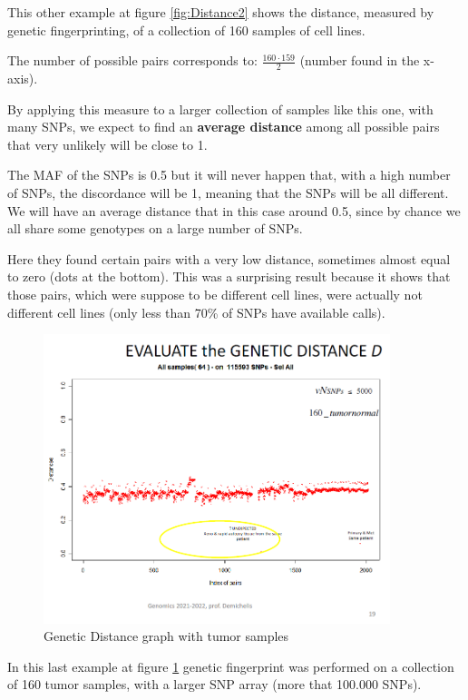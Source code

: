 \bigskip
This other example at figure \ref{fig:Distance2} shows the distance, measured by
genetic fingerprinting, of a collection of 160 samples of cell lines. 

The number of possible pairs corresponds to: $\frac{160 \cdot 159}{2}$ (number
found in the x-axis). 

By applying this measure to a larger collection of samples like this one, with
many SNPs, we expect to find an \textbf{average distance} among all possible
pairs that very unlikely will be close to 1. 

The MAF of the SNPs is 0.5 but it will never happen that, with a high number of
SNPs, the discordance will be 1, meaning that the SNPs will be all different. We
will have an average distance that in this case around 0.5, since by chance we
all share some genotypes on a large number of SNPs. 

Here they found certain pairs with a very low distance, sometimes almost equal
to zero (dots at the bottom). This was a surprising result because it shows that
those pairs, which were suppose to be different cell lines, were actually not
different cell lines (only less than 70\% of SNPs have available calls). 


\begin{figure}[ht]
	\centering
	\includegraphics[width=0.9\textwidth]{Distance3.PNG}
	\caption{\label{fig:Distance3}Genetic Distance graph with tumor samples}
\end{figure}

\bigskip
In this last example at figure \ref{fig:Distance3} genetic fingerprint was
performed on a collection of 160  tumor samples, with a larger SNP array (more
that 100.000 SNPs).  

